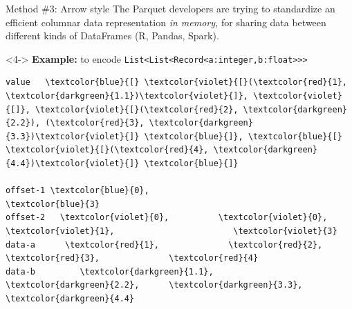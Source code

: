 \documentclass{beamer}
\begin{document}
\begin{frame}[fragile]{Method \#3: Arrow style}
\vspace{0.5 cm}
The Parquet developers are trying to standardize an efficient columnar data representation {\it in memory,} for sharing data between different kinds of DataFrames (R, Pandas, Spark).

\vspace{0.25 cm}

\vspace{0.25 cm}

\vspace{0.25 cm}
\begin{uncoverenv}<4->
{\bf Example:} to encode {\tt\footnotesize List<List<Record<a:integer,b:float>>>}

\scriptsize\bf
\begin{Verbatim}[commandchars=\\\{\}]
value   \textcolor{blue}{[} \textcolor{violet}{[}(\textcolor{red}{1}, \textcolor{darkgreen}{1.1})\textcolor{violet}{]}, \textcolor{violet}{[]}, \textcolor{violet}{[}(\textcolor{red}{2}, \textcolor{darkgreen}{2.2}), (\textcolor{red}{3}, \textcolor{darkgreen}{3.3})\textcolor{violet}{]} \textcolor{blue}{]}, \textcolor{blue}{[} \textcolor{violet}{[}(\textcolor{red}{4}, \textcolor{darkgreen}{4.4})\textcolor{violet}{]} \textcolor{blue}{]}

offset-1 \textcolor{blue}{0},                                        \textcolor{blue}{3}
offset-2   \textcolor{violet}{0},          \textcolor{violet}{0},  \textcolor{violet}{1},                        \textcolor{violet}{3}
data-a      \textcolor{red}{1},              \textcolor{red}{2},        \textcolor{red}{3},              \textcolor{red}{4}
data-b         \textcolor{darkgreen}{1.1},            \textcolor{darkgreen}{2.2},      \textcolor{darkgreen}{3.3},            \textcolor{darkgreen}{4.4}
\end{Verbatim}
\end{uncoverenv}

\vspace{0.25 cm}\normalsize\sf
{}
\end{frame}
\end{document}
